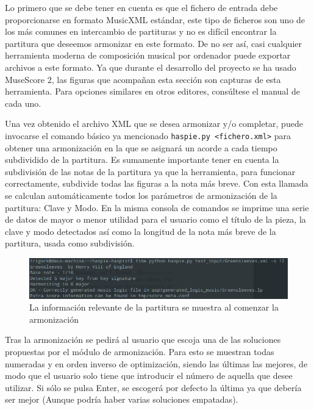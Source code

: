 Lo primero que se debe tener en cuenta es que el fichero de entrada debe proporcionarse en formato MusicXML estándar, este tipo de ficheros son uno de los más comunes en intercambio de partituras y no es difícil encontrar la partitura que deseemos armonizar en este formato. De no ser así, casi cualquier herramienta moderna de composición musical por ordenador puede exportar archivos a este formato. Ya que durante el desarrollo del proyecto se ha usado MuseScore 2, las figuras que acompañan esta sección son capturas de esta herramienta. Para opciones similares en otros editores, consúltese el manual de cada uno.

Una vez obtenido el archivo XML que se desea armonizar y/o completar, puede invocarse el comando básico ya mencionado \texttt{haspie.py <fichero.xml>} para obtener una armonización en la que se asignará un acorde a cada tiempo subdividido de la partitura. Es sumamente importante tener en cuenta la subdivisión de las notas de la partitura ya que la herramienta, para funcionar correctamente, subdivide todas las figuras a la nota más breve. Con esta llamada se calculan automáticamente todos los parámetros de armonización de la partitura: Clave y Modo. En la misma consola de comandos se imprime una serie de datos de mayor o menor utilidad para el usuario como el título de la pieza, la clave y modo detectados así como la longitud de la nota más breve de la partitura, usada como subdivisión. 

\begin{figure}[h]
	\centering
	\includegraphics[width=0.8\linewidth]{imagenes/usage/metainfo.png}
	\caption{La información relevante de la partitura se muestra al comenzar la armonización}
	\label{fig:usage_metainfo}
\end{figure}

Tras la armonización se pedirá al usuario que escoja una de las soluciones propuestas por el módulo de armonización. Para esto se muestran todas numeradas y en orden inverso de optimización, siendo las últimas las mejores, de modo que el usuario solo tiene que introducir el número de aquella que desee utilizar. Si sólo se pulsa Enter, se escogerá por defecto la última ya que debería ser mejor (Aunque podría haber varias soluciones empatadas).


